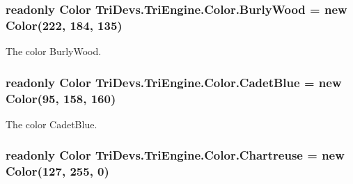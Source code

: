 \hypertarget{struct_tri_devs_1_1_tri_engine_1_1_color_a62a87f7891a89e57c0767036e329ee8e}{
\subsubsection[{Burly\-Wood}]{\setlength{\rightskip}{0pt plus 5cm}readonly {\bf Color} Tri\-Devs.\-Tri\-Engine.\-Color.\-Burly\-Wood = new {\bf Color}(222, 184, 135)\hspace{0.3cm}{\ttfamily [static]}}}\label{struct_tri_devs_1_1_tri_engine_1_1_color_a62a87f7891a89e57c0767036e329ee8e}


The color Burly\-Wood. 

\hypertarget{struct_tri_devs_1_1_tri_engine_1_1_color_ad02139884481a691ab9aeb5dbe785183}{
\subsubsection[{Cadet\-Blue}]{\setlength{\rightskip}{0pt plus 5cm}readonly {\bf Color} Tri\-Devs.\-Tri\-Engine.\-Color.\-Cadet\-Blue = new {\bf Color}(95, 158, 160)\hspace{0.3cm}{\ttfamily [static]}}}\label{struct_tri_devs_1_1_tri_engine_1_1_color_ad02139884481a691ab9aeb5dbe785183}


The color Cadet\-Blue. 

\hypertarget{struct_tri_devs_1_1_tri_engine_1_1_color_ad93b0b8683b7c8ac73619c095aee63d4}{
\subsubsection[{Chartreuse}]{\setlength{\rightskip}{0pt plus 5cm}readonly {\bf Color} Tri\-Devs.\-Tri\-Engine.\-Color.\-Chartreuse = new {\bf Color}(127, 255, 0)\hspace{0.3cm}{\ttfamily [static]}}}\label{struct_tri_devs_1_1_tri_engine_1_1_color_ad93b0b8683b7c8ac73619c095aee63d4}


